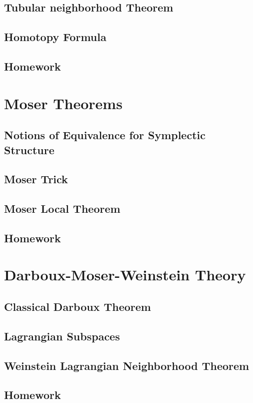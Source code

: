\documentclass[4paper]{article}
\begin{document}
\subsection{Tubular neighborhood Theorem}
\subsection{Homotopy Formula}
\subsection{Homework}
\section{Moser Theorems}
\subsection{Notions of Equivalence for Symplectic Structure}
\subsection{Moser Trick}
\subsection{Moser Local Theorem}
\subsection{Homework}
\section{Darboux-Moser-Weinstein Theory}
\subsection{Classical Darboux Theorem}
\subsection{Lagrangian Subspaces}
\subsection{Weinstein Lagrangian Neighborhood Theorem}
\subsection{Homework}
\end{document}
